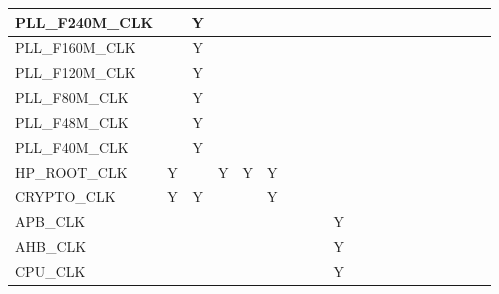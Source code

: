 \documentclass[main\_\_EN.tex]{subfiles}
\begin{document}
\begin{landscape}
\begin{tiny}
\begin{longtable}[c]{|m{2cm}|c|c|c|c|c|c|c|c|c|C{1.5cm}|c|c|c|c|c|c|c|c|c| }
    PLL\_F240M\_CLK &   & Y &   &  &   &   &   &   &  &   &   &   &   &   &      &   &  &  \\ \hline
    PLL\_F160M\_CLK &   & Y &   &  &   &   &   &   &  &   &   &   &   &   &     &   &  &  \\ \hline
    PLL\_F120M\_CLK &   & Y &   &  &   &   &   &   &  &   &   &   &   &   &      &   &  &  \\ \hline
    PLL\_F80M\_CLK &   & Y &   &  &   &   &   &   &  &   &   &   &   &   &      &   &  &  \\ \hline
    PLL\_F48M\_CLK &   & Y &   &  &   &   &   &   &  &   &   &   &   &   &      &   &  &  \\ \hline
    PLL\_F40M\_CLK &   & Y &   &  &   &   &   &   &  &   &   &   &   &   &      &   &  &  \\ \hline
    HP\_ROOT\_CLK & Y &   & Y & Y & Y &   &   &   &  &   &   &   &   &   &      &   &  &  \\ \hline
    CRYPTO\_CLK & Y & Y &   &  & Y &   &   &   &  &   &   &   &   &   &   &      &  &  \\ \hline
    APB\_CLK &   &   &   &  &   &   &   &   &   Y &   &   &   &   &   &   &   &  &  \\ \hline
    AHB\_CLK &   &   &   &  &   &   &   &   &   Y &   &   &   &   &   &   &   &  &  \\ \hline
    CPU\_CLK &   &   &   &  &   &   &   &   &   Y &   &   &   &   &   &   &   &  &  \\ \hline
\end{longtable}



\end{tiny}
\end{landscape}
\end{document}
